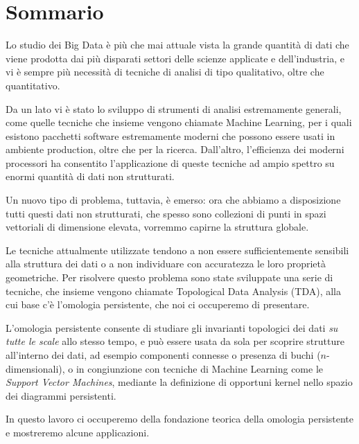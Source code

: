 \begingroup
\let\clearpage\relax
\let\cleardoublepage\relax
\let\cleardoublepage\relax

\chapter*{Sommario}

Lo studio dei Big Data è più che mai attuale vista la grande quantità di dati che viene prodotta dai più disparati settori delle scienze applicate e dell'industria, e vi è sempre più necessità di tecniche di analisi di tipo qualitativo, oltre che quantitativo.

Da un lato vi è stato lo sviluppo di strumenti di analisi estremamente generali, come quelle tecniche che insieme vengono chiamate Machine Learning, per i quali esistono pacchetti software estremamente moderni che possono essere usati in ambiente production, oltre che per la ricerca. Dall'altro, l'efficienza dei moderni processori ha consentito l'applicazione di queste tecniche ad ampio spettro su enormi quantità di dati non strutturati.

Un nuovo tipo di problema, tuttavia, è emerso: ora che abbiamo a disposizione tutti questi dati non strutturati, che spesso sono collezioni di punti in spazi vettoriali di dimensione elevata, vorremmo capirne la struttura globale.

Le tecniche attualmente utilizzate tendono a non essere sufficientemente sensibili alla struttura dei dati o a non individuare con accuratezza le loro proprietà geometriche. Per risolvere questo problema sono state sviluppate una serie di tecniche, che insieme vengono chiamate Topological Data Analysis (TDA), alla cui base c'è l'omologia persistente, che noi ci occuperemo di presentare.

L'omologia persistente consente di studiare gli invarianti topologici dei dati \emph{su tutte le scale} allo stesso tempo, e può essere usata da sola per scoprire strutture all'interno dei dati, ad esempio componenti connesse o presenza di buchi ($n$-dimensionali), o in congiunzione con tecniche di Machine Learning come le \emph{Support Vector Machines}, mediante la definizione di opportuni kernel nello spazio dei diagrammi persistenti.

In questo lavoro ci occuperemo della fondazione teorica della omologia persistente e mostreremo alcune applicazioni.

\vfill

\endgroup

\vfill
